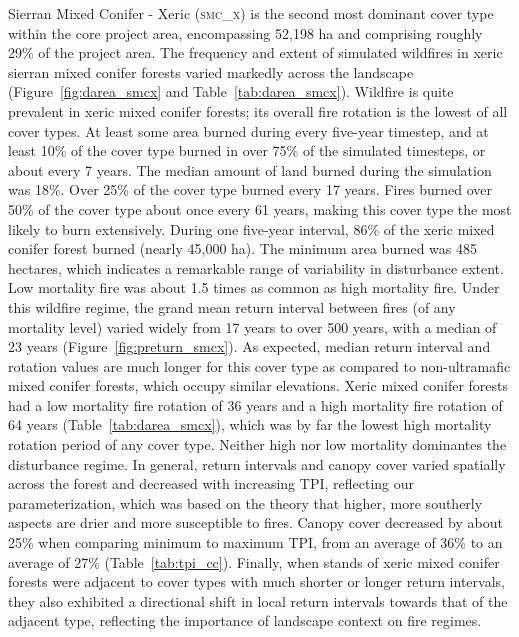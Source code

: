 Sierran Mixed Conifer - Xeric (\textsc{smc\_x}) is the second most dominant cover type within the core project area, encompassing 52,198 ha and comprising roughly 29\% of the project area. The frequency and extent of simulated wildfires in xeric sierran mixed conifer forests varied markedly across the landscape (Figure~\ref{fig:darea_smcx} and Table~\ref{tab:darea_smcx}).  %
%
Wildfire is quite prevalent in xeric mixed conifer forests; its overall fire rotation is the lowest of all cover types. At least some area burned during every five-year timestep, and at least 10\% of the cover type burned in over 75\% of the simulated timesteps, or about every 7 years. The median amount of land burned during the simulation was 18\%. Over 25\% of the cover type burned every 17 years. Fires burned over 50\% of the cover type about once every 61 years, making this cover type the most likely to burn extensively. During one five-year interval, 86\% of the xeric mixed conifer forest burned (nearly 45,000 ha). The minimum area burned was 485 hectares, which indicates a remarkable range of variability in disturbance extent. Low mortality fire was about 1.5 times as common as high mortality fire. %
%
Under this wildfire regime, the grand mean return interval between fires (of any mortality level) varied widely from 17 years to over 500 years, with a median of 23 years (Figure~\ref{fig:preturn_smcx}). As expected, median return interval and rotation values are much longer for this cover type as compared to non-ultramafic mixed conifer forests, which occupy similar elevations. Xeric mixed conifer forests had a low mortality fire rotation of 36 years and a high mortality fire rotation of 64 years (Table~\ref{tab:darea_smcx}), which was by far the lowest high mortality rotation period of any cover type. Neither high nor low mortality dominantes the disturbance regime. %
%
In general, return intervals and canopy cover varied spatially across the forest and decreased with increasing TPI, reflecting our parameterization, which was based on the theory that higher, more southerly aspects are drier and more susceptible to fires. Canopy cover decreased by about 25\% when comparing minimum to maximum TPI, from an average of 36\% to an average of 27\% (Table~\ref{tab:tpi_cc}).  %
%
Finally, when stands of xeric mixed conifer forests were adjacent to cover types with much shorter or longer return intervals, they also exhibited a directional shift in local return intervals towards that of the adjacent type, reflecting the importance of landscape context on fire regimes.

